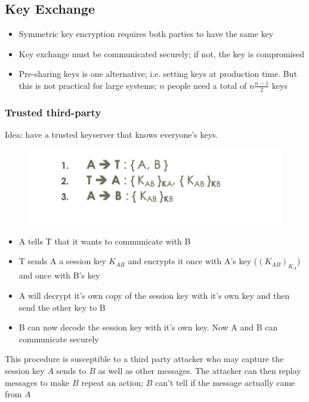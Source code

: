 \documentclass[../notes.tex]{subfiles}
\begin{document}
\subsection{Key Exchange}
\begin{itemize}
    \item Symmetric key encryption requires both parties to have the same key
    \item Key exchange must be communicated securely; if not, the key is compromised
    \item Pre-sharing keys is one alternative; i.e. setting keys at production time. But this is not practical for large systems; $ n $ people need a total of $ n\frac{n-1}{2} $ keys
\end{itemize}

\subsubsection{Trusted third-party}

Idea: have a trusted keyserver that knows everyone's keys.

\begin{figure}[H]
    \centering
    \includegraphics[width=0.8\linewidth]{img/image_2023-02-10-16-43-12.png}
\end{figure}
\begin{itemize}
    \item A tells T that it wants to communicate with B
    \item T sends A a session key $ K_{AB} $ and encrypts it once with A's key ($ (K_{AB})_{K_A} $) and once with B's key
    \item A will decrypt it's own copy of the session key with it's own key and then send the other key to B
    \item B can now decode the session key with it's own key. Now A and B can communicate securely
\end{itemize}

This procedure is susceptible to a third party attacker who may capture the session key $ A $ sends to $ B $ as well as other messages. The attacker can then replay messages to make $ B $ repeat an action; $B  $ can't tell if the message actually came from $ A $
\end{document}
